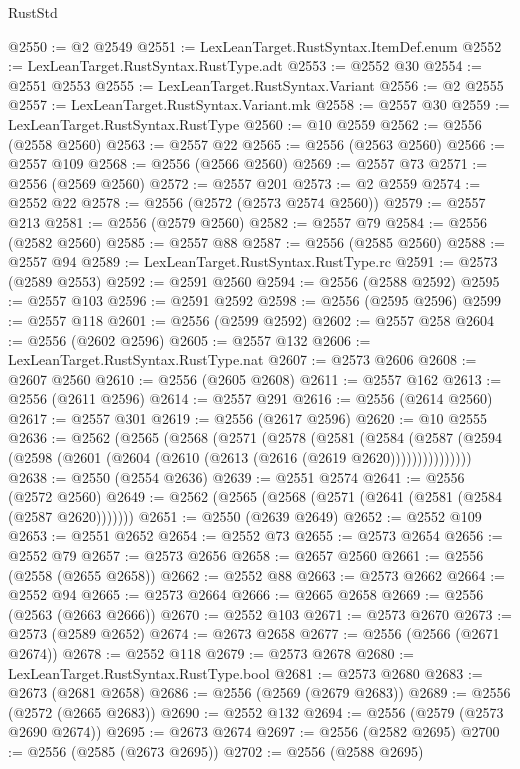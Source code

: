 \begin{lexlean}{RustStd}
\begin{coremodule}
@2550 := @2 @2549
@2551 := LexLeanTarget.RustSyntax.ItemDef.enum
@2552 := LexLeanTarget.RustSyntax.RustType.adt
@2553 := @2552 @30
@2554 := @2551 @2553
@2555 := LexLeanTarget.RustSyntax.Variant
@2556 := @2 @2555
@2557 := LexLeanTarget.RustSyntax.Variant.mk
@2558 := @2557 @30
@2559 := LexLeanTarget.RustSyntax.RustType
@2560 := @10 @2559
@2562 := @2556 (@2558 @2560)
@2563 := @2557 @22
@2565 := @2556 (@2563 @2560)
@2566 := @2557 @109
@2568 := @2556 (@2566 @2560)
@2569 := @2557 @73
@2571 := @2556 (@2569 @2560)
@2572 := @2557 @201
@2573 := @2 @2559
@2574 := @2552 @22
@2578 := @2556 (@2572 (@2573 @2574 @2560))
@2579 := @2557 @213
@2581 := @2556 (@2579 @2560)
@2582 := @2557 @79
@2584 := @2556 (@2582 @2560)
@2585 := @2557 @88
@2587 := @2556 (@2585 @2560)
@2588 := @2557 @94
@2589 := LexLeanTarget.RustSyntax.RustType.rc
@2591 := @2573 (@2589 @2553)
@2592 := @2591 @2560
@2594 := @2556 (@2588 @2592)
@2595 := @2557 @103
@2596 := @2591 @2592
@2598 := @2556 (@2595 @2596)
@2599 := @2557 @118
@2601 := @2556 (@2599 @2592)
@2602 := @2557 @258
@2604 := @2556 (@2602 @2596)
@2605 := @2557 @132
@2606 := LexLeanTarget.RustSyntax.RustType.nat
@2607 := @2573 @2606
@2608 := @2607 @2560
@2610 := @2556 (@2605 @2608)
@2611 := @2557 @162
@2613 := @2556 (@2611 @2596)
@2614 := @2557 @291
@2616 := @2556 (@2614 @2560)
@2617 := @2557 @301
@2619 := @2556 (@2617 @2596)
@2620 := @10 @2555
@2636 := @2562
    (@2565
      (@2568
        (@2571
          (@2578
            (@2581
              (@2584
                (@2587 (@2594 (@2598 (@2601 (@2604 (@2610 (@2613 (@2616 (@2619 @2620)))))))))))))))
@2638 := @2550 (@2554 @2636)
@2639 := @2551 @2574
@2641 := @2556 (@2572 @2560)
@2649 := @2562 (@2565 (@2568 (@2571 (@2641 (@2581 (@2584 (@2587 @2620)))))))
@2651 := @2550 (@2639 @2649)
@2652 := @2552 @109
@2653 := @2551 @2652
@2654 := @2552 @73
@2655 := @2573 @2654
@2656 := @2552 @79
@2657 := @2573 @2656
@2658 := @2657 @2560
@2661 := @2556 (@2558 (@2655 @2658))
@2662 := @2552 @88
@2663 := @2573 @2662
@2664 := @2552 @94
@2665 := @2573 @2664
@2666 := @2665 @2658
@2669 := @2556 (@2563 (@2663 @2666))
@2670 := @2552 @103
@2671 := @2573 @2670
@2673 := @2573 (@2589 @2652)
@2674 := @2673 @2658
@2677 := @2556 (@2566 (@2671 @2674))
@2678 := @2552 @118
@2679 := @2573 @2678
@2680 := LexLeanTarget.RustSyntax.RustType.bool
@2681 := @2573 @2680
@2683 := @2673 (@2681 @2658)
@2686 := @2556 (@2569 (@2679 @2683))
@2689 := @2556 (@2572 (@2665 @2683))
@2690 := @2552 @132
@2694 := @2556 (@2579 (@2573 @2690 @2674))
@2695 := @2673 @2674
@2697 := @2556 (@2582 @2695)
@2700 := @2556 (@2585 (@2673 @2695))
@2702 := @2556 (@2588 @2695)

\end{coremodule}
\end{lexlean}
